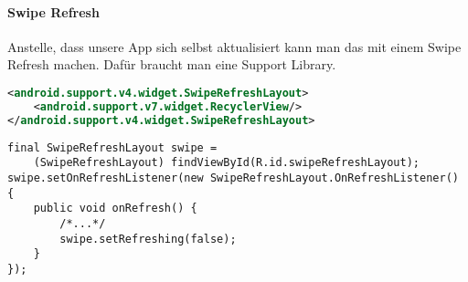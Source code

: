 \paragraph{Swipe Refresh} Anstelle, dass unsere App sich selbst aktualisiert kann man das mit einem Swipe Refresh machen. Dafür braucht man eine Support Library.
\begin{lstlisting}[language=xml]
<android.support.v4.widget.SwipeRefreshLayout>
    <android.support.v7.widget.RecyclerView/>
</android.support.v4.widget.SwipeRefreshLayout>
\end{lstlisting}
\begin{lstlisting}
final SwipeRefreshLayout swipe = 
    (SwipeRefreshLayout) findViewById(R.id.swipeRefreshLayout);
swipe.setOnRefreshListener(new SwipeRefreshLayout.OnRefreshListener() {
    public void onRefresh() {
        /*...*/
        swipe.setRefreshing(false);
    }
});
\end{lstlisting}
